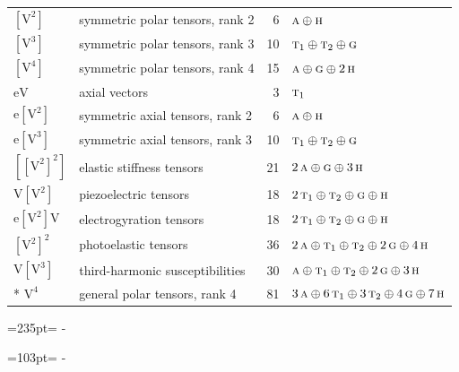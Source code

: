 \documentclass[10pt,a4paper]{article}
\newcommand{\needspace}[1]{\par\penalty-100\begingroup\dimen0=#1\relax\dimen2=\pagegoal
  \advance\dimen2-\pagetotal\ifdim\dimen0>\dimen2\relax\ifdim\dimen2>0pt\vfil\break\fi\fi
  \endgroup}
\numberwithin{equation}{section}
\newcommand{\irr}[1]{\text{\normalfont\scshape #1}}
\newcommand{\jahn}[1]{\mathrm{#1}}
\newlength{\fillwidth}\newlength{\cellwidth}\newlength{\colwidth}
\begin{document}
{\begin{longtable}{@{}llr>{\RaggedRight\arraybackslash}p{\fillwidth}@{}}
$\jahn{[V^{2}]}$ & symmetric polar tensors, rank 2 & 6 & $\irr{a} \oplus\allowbreak \irr{h}$\\
$\jahn{[V^{3}]}$ & symmetric polar tensors, rank 3 & 10 & $\irr{t}_{1} \oplus\allowbreak \irr{t}_{2} \oplus\allowbreak \irr{g}$\\
$\jahn{[V^{4}]}$ & symmetric polar tensors, rank 4 & 15 & $\irr{a} \oplus\allowbreak \irr{g} \oplus\allowbreak 2\,\irr{h}$\\
$\jahn{eV}$ & axial vectors & 3 & $\irr{t}_{1}$\\
$\jahn{e[V^{2}]}$ & symmetric axial tensors, rank 2 & 6 & $\irr{a} \oplus\allowbreak \irr{h}$\\
$\jahn{e[V^{3}]}$ & symmetric axial tensors, rank 3 & 10 & $\irr{t}_{1} \oplus\allowbreak \irr{t}_{2} \oplus\allowbreak \irr{g}$\\
$\jahn{[[V^{2}]^{2}]}$ & elastic stiffness tensors & 21 & $2\,\irr{a} \oplus\allowbreak \irr{g} \oplus\allowbreak 3\,\irr{h}$\\
$\jahn{V[V^{2}]}$ & piezoelectric tensors & 18 & $2\,\irr{t}_{1} \oplus\allowbreak \irr{t}_{2} \oplus\allowbreak \irr{g} \oplus\allowbreak \irr{h}$\\
$\jahn{e[V^{2}]V}$ & electrogyration tensors & 18 & $2\,\irr{t}_{1} \oplus\allowbreak \irr{t}_{2} \oplus\allowbreak \irr{g} \oplus\allowbreak \irr{h}$\\
$\jahn{[V^{2}]^{2}}$ & photoelastic tensors & 36 & $2\,\irr{a} \oplus\allowbreak \irr{t}_{1} \oplus\allowbreak \irr{t}_{2} \oplus\allowbreak 2\,\irr{g} \oplus\allowbreak 4\,\irr{h}$\\
$\jahn{V[V^{3}]}$ & third-harmonic susceptibilities & 30 & $\irr{a} \oplus\allowbreak \irr{t}_{1} \oplus\allowbreak \irr{t}_{2} \oplus\allowbreak 2\,\irr{g} \oplus\allowbreak 3\,\irr{h}$\\*
$\jahn{V^{4}}$ & general polar tensors, rank 4 & 81 & $3\,\irr{a} \oplus\allowbreak 6\,\irr{t}_{1} \oplus\allowbreak 3\,\irr{t}_{2} \oplus\allowbreak 4\,\irr{g} \oplus\allowbreak 7\,\irr{h}$\\
\bottomrule\end{longtable}}
\needspace{235pt}
\needspace{103pt}
\end{document}
